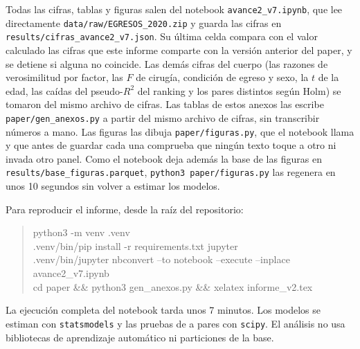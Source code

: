 \documentclass[10.5pt,a4paper,headings=small,abstract=false,bibliography=totoc,listof=totoc]{scrartcl}
\begin{document}
Todas las cifras, tablas y figuras salen del notebook \texttt{avance2\_v7.ipynb}, que lee directamente \texttt{data/raw/EGRESOS\_2020.zip} y guarda las cifras en \texttt{results/cifras\_avance2\_v7.json}. Su última celda compara con el valor calculado las cifras que este informe comparte con la versión anterior del paper, y se detiene si alguna no coincide. Las demás cifras del cuerpo (las razones de verosimilitud por factor, las $F$ de cirugía, condición de egreso y sexo, la $t$ de la edad, las caídas del pseudo-$R^2$ del ranking y los pares distintos según Holm) se tomaron del mismo archivo de cifras. Las tablas de estos anexos las escribe \texttt{paper/gen\_anexos.py} a partir del mismo archivo de cifras, sin transcribir números a mano. Las figuras las dibuja \texttt{paper/figuras.py}, que el notebook llama y que antes de guardar cada una comprueba que ningún texto toque a otro ni invada otro panel. Como el notebook deja además la base de las figuras en \texttt{results/base\_figuras.parquet}, \texttt{python3 paper/figuras.py} las regenera en unos 10 segundos sin volver a estimar los modelos.

Para reproducir el informe, desde la raíz del repositorio:

\begin{quote}\small\ttfamily
python3 -m venv .venv\\
.venv/bin/pip install -r requirements.txt jupyter\\
.venv/bin/jupyter nbconvert --to notebook --execute --inplace avance2\_v7.ipynb\\
cd paper \&\& python3 gen\_anexos.py \&\& xelatex informe\_v2.tex
\end{quote}

La ejecución completa del notebook tarda unos 7 minutos. Los modelos se estiman con \texttt{statsmodels} y las pruebas de a pares con \texttt{scipy}. El análisis no usa bibliotecas de aprendizaje automático ni particiones de la base.
\end{document}
